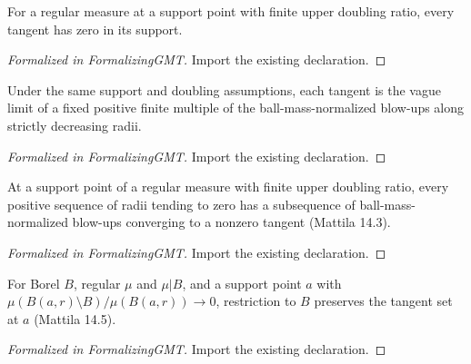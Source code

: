 \begin{theorem}
\label{gmt:origin-support}
\leanok
{}
For a regular measure at a support point with finite upper doubling ratio, every tangent has zero in its support.
\end{theorem}
\begin{proof}[Formalized in FormalizingGMT]
\leanok
{}
Import the existing declaration.
\end{proof}

\begin{theorem}
\label{gmt:normalized-tangent}
\leanok
{}
Under the same support and doubling assumptions, each tangent is the vague limit of a fixed positive finite multiple of the ball-mass-normalized blow-ups along strictly decreasing radii.
\end{theorem}
\begin{proof}[Formalized in FormalizingGMT]
\leanok
{}
Import the existing declaration.
\end{proof}

\begin{theorem}
\label{thm:doubling}
\leanok
{}
At a support point of a regular measure with finite upper doubling ratio, every positive sequence of radii tending to zero has a subsequence of ball-mass-normalized blow-ups converging to a nonzero tangent (Mattila 14.3).
\end{theorem}
\begin{proof}[Formalized in FormalizingGMT]
\leanok
{}
Import the existing declaration.
\end{proof}

\begin{theorem}
\label{gmt:restriction-tangents}
\leanok
{}
For Borel $B$, regular $\mu$ and $\mu|B$, and a support point $a$ with $\mu(B(a,r)\setminus B)/\mu(B(a,r))\to0$, restriction to $B$ preserves the tangent set at $a$ (Mattila 14.5).
\end{theorem}
\begin{proof}[Formalized in FormalizingGMT]
\leanok
{}
Import the existing declaration.
\end{proof}

